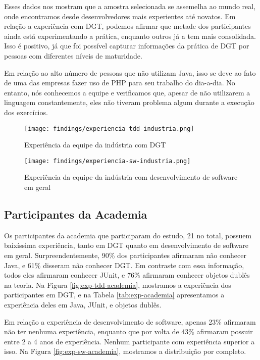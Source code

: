 Esses dados nos mostram que a amostra selecionada se assemelha ao mundo real, onde
encontramos desde desenvolvedores mais experientes até novatos. Em relação a experiência com DGT,
podemos afirmar que metade dos participantes ainda está experimentando a prática, enquanto
outros já a tem mais consolidada. Isso é positivo, já que foi possível capturar informações
da prática de DGT por pessoas com diferentes níveis de maturidade.

Em relação ao alto número de pessoas que não utilizam Java, isso se deve ao fato de uma das
empresas fazer uso de PHP para seu trabalho do dia-a-dia. No entanto, nós conhecemos a equipe
e verificamos que, apesar de não utilizarem a linguagem constantemente, eles não tiveram
problema algum durante a execução dos exercícios.

\begin{figure}[h!]
  \centering
  \texttt{[image: findings/experiencia-tdd-industria.png]}
  \caption{Experiência da equipe da indústria com DGT}
  \label{fig:exp-tdd-industria}
\end{figure}

\begin{figure}[h!]
  \centering
  \texttt{[image: findings/experiencia-sw-industria.png]}
  \caption{Experiência da equipe da indústria com desenvolvimento de software em geral}
  \label{fig:exp-sw-industria}
\end{figure}

\subsection{Participantes da Academia}
\label{findings-desc-academia}

Os participantes da academia que participaram do estudo, 21 no total, possuem baixíssima experiência,
tanto em DGT quanto em desenvolvimento de software em geral. Surpreendentemente, 90\%
dos participantes afirmaram não conhecer Java, e 61\% disseram não conhecer DGT.
Em contraste com essa informação, todos eles afirmaram conhecer JUnit, e 76\% afirmaram
conhecer objetos dublês na teoria. 
Na Figura \ref{fig:exp-tdd-academia}, mostramos a experiência dos participantes em DGT, e
na Tabela \ref{tab:exp-academia} apresentamos a experiência deles em Java, JUnit, e objetos
dublês.

Em relação a experiência de desenvolvimento de software, apenas 23\% afirmaram não
ter nenhuma experiência, enquanto que por volta de 43\% afirmaram possuir
entre 2 a 4 anos de experiência. Nenhum participante com experiência superior a isso.
Na Figura \ref{fig:exp-sw-academia}, mostramos a distribuição por completo.

